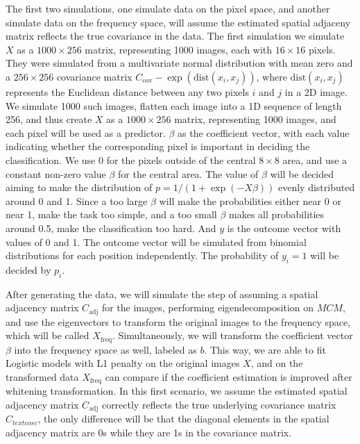 \documentclass[12pt]{article}
\begin{document}
The first two simulations, one simulate data on the pixel space, and another simulate data on the frequency space, will assume the estimated spatial adjaceny matrix reflects the true covariance in the data. The first simulation we simulate \( X \) as a \( 1000 \times 256 \) matrix, representing 1000 images, each with \( 16 \times 16 \) pixels. They were simulated from a multivariate normal distribution with mean zero and a \( 256 \times 256 \) covariance matrix \( C_{\text{cov}} - \exp (\text{dist} (x_i, x_j )) \), where \( \text{dist}(x_i, x_j) \) represents the Euclidean distance between any two pixels \( i \) and \( j \) in a 2D image. We simulate 1000 such images, flatten each image into a 1D sequence of length 256, and thus create \( X \) as a \( 1000 \times 256 \) matrix, representing 1000 images, and each pixel will be used as a predictor. \( \beta \) as the coefficient vector, with each value indicating whether the corresponding pixel is important in deciding the classification. We use 0 for the pixels outside of the central \( 8 \times 8 \) area, and use a constant non-zero value \( \beta \) for the central area. The value of \( \beta \) will be decided aiming to make the distribution of \( p = 1 / (1 + \exp (- X \beta)) \) evenly distributed around 0 and 1. Since a too large \( \beta \) will make the probabilities either near 0 or near 1, make the task too simple, and a too small \( \beta \) makes all probabilities around 0.5, make the classification too hard.
And \( y \) is the outcome vector with values of 0 and 1. The outcome vector will be simulated from binomial distributions for each position independently. The probability of \( y_i = 1 \) will be decided by \( p_i \).

After generating the data, we will simulate the step of assuming a spatial adjacency matrix \( C_{\text{adj}} \) for the images, performing eigendecomposition on \( M C M \), and use the eigenvectors to transform the original images to the frequency space, which will be called \( X_{\text{freq}} \). Simultaneously, we will transform the coefficient vector \( \beta \) into the frequency space as well, labeled as \( b \). This way, we are able to fit Logistic models with L1 penalty on the original images \( X \), and on the transformed data \( X_{\text{freq}} \) can compare if the coefficient estimation is improved after whitening transformation. In this first scenario, we assume the estimated spatial adjacency matrix \( C_{\text{adj}} \) correctly reflects the true underlying covariance matrix \( C_{text{cosv}} \), the only difference will be that the diagonal elements in the spatial adjacency matrix are 0s while they are 1s in the covariance matrix.
\end{document}
